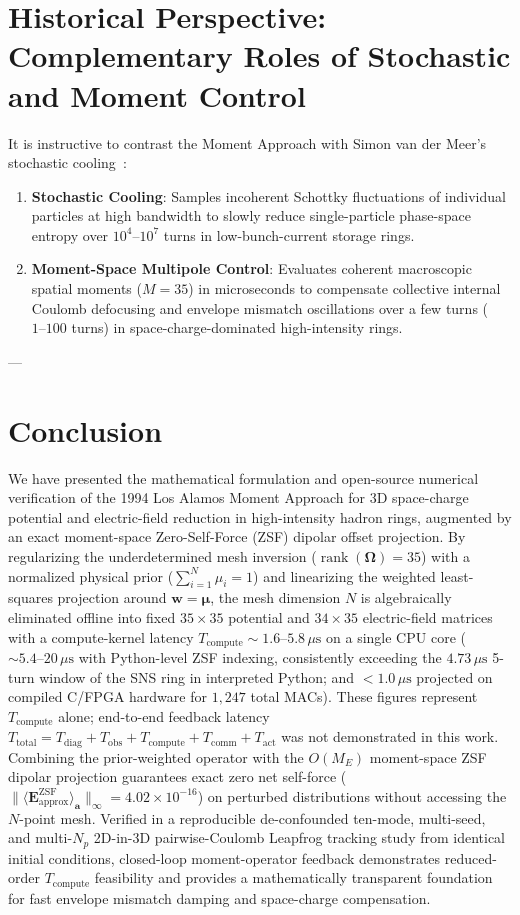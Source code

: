 \documentclass[11pt,a4paper]{article}
\newcommand{\bOmega}{\mathbf{\Omega}}
\begin{document}
\section{Historical Perspective: Complementary Roles of Stochastic and Moment Control}
It is instructive to contrast the Moment Approach with Simon van der Meer's stochastic cooling~\cite{vandermeer1972stochastic,vandermeer1985nobel}:
\begin{enumerate}
    \item \textbf{Stochastic Cooling}: Samples incoherent Schottky fluctuations of individual particles at high bandwidth to slowly reduce single-particle phase-space entropy over $10^4\text{--}10^7$ turns in low-bunch-current storage rings.
    \item \textbf{Moment-Space Multipole Control}: Evaluates coherent macroscopic spatial moments ($M=35$) in microseconds to compensate collective internal Coulomb defocusing and envelope mismatch oscillations over a few turns ($1\text{--}100$ turns) in space-charge-dominated high-intensity rings.
\end{enumerate}

---

\section{Conclusion}
We have presented the mathematical formulation and open-source numerical verification of the 1994 Los Alamos Moment Approach for 3D space-charge potential and electric-field reduction in high-intensity hadron rings, augmented by an exact moment-space Zero-Self-Force (ZSF) dipolar offset projection. By regularizing the underdetermined mesh inversion ($\operatorname{rank}(\bOmega) = 35$) with a normalized physical prior ($\sum_{i=1}^N \mu_i = 1$) and linearizing the weighted least-squares projection around $\bm{w} = \bm{\mu}$, the mesh dimension $N$ is algebraically eliminated offline into fixed $35 \times 35$ potential and $34 \times 35$ electric-field matrices with a compute-kernel latency $T_{\mathrm{compute}} \sim 1.6\text{--}5.8\,\mu\mathrm{s}$ on a single CPU core ($\sim 5.4\text{--}20\,\mu\mathrm{s}$ with Python-level ZSF indexing, consistently exceeding the $4.73\,\mu\mathrm{s}$ 5-turn window of the SNS ring in interpreted Python; and $< 1.0\,\mu\mathrm{s}$ projected on compiled C/FPGA hardware for $1,247$ total MACs). These figures represent $T_{\mathrm{compute}}$ alone; end-to-end feedback latency $T_{\mathrm{total}} = T_{\mathrm{diag}} + T_{\mathrm{obs}} + T_{\mathrm{compute}} + T_{\mathrm{comm}} + T_{\mathrm{act}}$ was not demonstrated in this work. Combining the prior-weighted operator with the $O(M_E)$ moment-space ZSF dipolar projection guarantees exact zero net self-force ($\|\langle \bm{E}_{\mathrm{approx}}^{\mathrm{ZSF}}\rangle_{\bm{a}}\|_\infty = 4.02 \times 10^{-16}$) on perturbed distributions without accessing the $N$-point mesh. Verified in a reproducible de-confounded ten-mode, multi-seed, and multi-$N_p$ 2D-in-3D pairwise-Coulomb Leapfrog tracking study from identical initial conditions, closed-loop moment-operator feedback demonstrates reduced-order $T_{\mathrm{compute}}$ feasibility and provides a mathematically transparent foundation for fast envelope mismatch damping and space-charge compensation.
\end{document}
